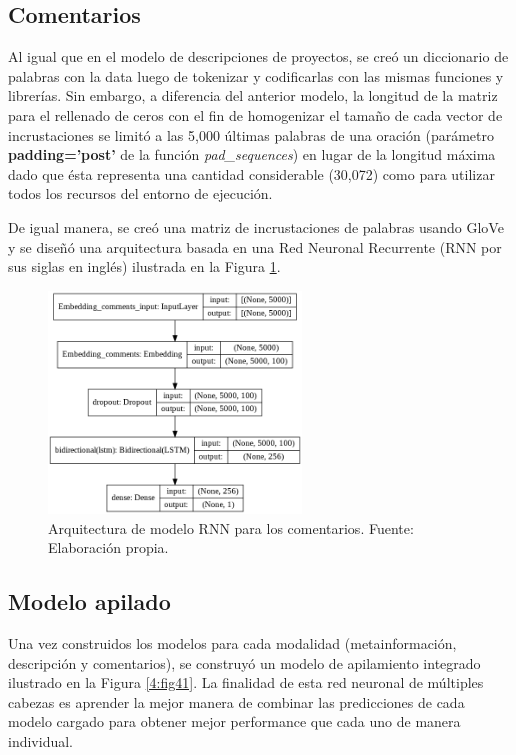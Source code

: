 \subsection{Comentarios}
Al igual que en el modelo de descripciones de proyectos, se creó un diccionario de palabras con la data luego de tokenizar y codificarlas con las mismas funciones y librerías. Sin embargo, a diferencia del anterior modelo, la longitud de la matriz para el rellenado de ceros con el fin de homogenizar el tamaño de cada vector de incrustaciones se limitó a las 5,000 últimas palabras de una oración (parámetro \textbf{padding='post'} de la función \textit{pad\_sequences}) en lugar de la longitud máxima dado que ésta representa una cantidad considerable (30,072) como para utilizar todos los recursos del entorno de ejecución.

De igual manera, se creó una matriz de incrustaciones de palabras usando GloVe y se diseñó una arquitectura basada en una Red Neuronal Recurrente (RNN por sus siglas en inglés) ilustrada en la Figura \ref{4:fig40}.

\begin{figure}[!ht]
	\begin{center}
		\includegraphics[width=0.60\textwidth]{4/figures/model_rnn_comments.png}
		\caption{Arquitectura de modelo RNN para los comentarios. Fuente: Elaboración propia.}
		\label{4:fig40}
	\end{center}
\end{figure}

\subsection{Modelo apilado}
Una vez construidos los modelos para cada modalidad (metainformación, descripción y comentarios), se construyó un modelo de apilamiento integrado ilustrado en la Figura \ref{4:fig41}. La finalidad de esta red neuronal de múltiples cabezas es aprender la mejor manera de combinar las predicciones de cada modelo cargado para obtener mejor performance que cada uno de manera individual.

